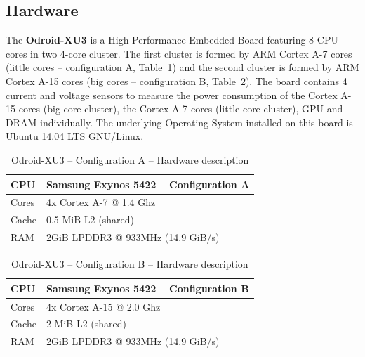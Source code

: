 \documentclass{acm_proc_article-sp}
\begin{document}
\subsection{Hardware}
\label{hardware}
The \textbf{Odroid-XU3} 
is a High Performance Embedded Board featuring 8 CPU cores in two 4-core cluster. The first cluster is formed by ARM Cortex A-7 cores (little cores -- configuration A, Table~\ref{tbl:hardware1}) and the second cluster is formed by ARM Cortex A-15 cores (big cores -- configuration B, Table~\ref{tbl:hardware2}).  The board contains 4 current and voltage sensors to measure the power consumption of the Cortex A-15 cores (big core cluster), the Cortex A-7 cores (little core cluster), GPU and DRAM individually. The underlying Operating System installed on this board is Ubuntu 14.04 LTS GNU/Linux.
\begin{table}[ht]
  \begin{center}
    \begin{tabular}{| l | p{6cm} |}
      \hline
      CPU & Samsung Exynos 5422 -- Configuration A\\ \hline
      Cores & 4x Cortex A-7 @ 1.4 Ghz  \\ \hline
      Cache & 0.5 MiB L2 (shared) \\ \hline
      RAM & 2GiB LPDDR3 @ 933MHz (14.9 GiB/s)  \\ \hline
    \end{tabular}
    \caption{Odroid-XU3 -- Configuration A -- Hardware description}
    \label{tbl:hardware1}
  \end{center}
\end{table}
\begin{table}[ht]
  \begin{center}
    \begin{tabular}{| l | p{6cm} |}
      \hline
      CPU & Samsung Exynos 5422  -- Configuration B\\ \hline
      Cores & 4x Cortex A-15 @ 2.0 Ghz  \\ \hline
      Cache & 2 MiB L2 (shared) \\ \hline
      RAM & 2GiB LPDDR3 @ 933MHz (14.9 GiB/s)  \\ \hline
    \end{tabular}
    \caption{Odroid-XU3 -- Configuration B -- Hardware description}
    \label{tbl:hardware2}
  \end{center}
\end{table}
\end{document}
